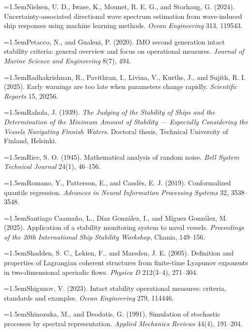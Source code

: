 \documentclass[11pt]{article}
\begin{document}
\hangindent=1.5em\noindent Nielsen, U. D., Iwase, K., Mounet, R. E. G., and Storhaug, G. (2024). Uncertainty-associated directional wave spectrum estimation from wave-induced ship responses using machine learning methods. \emph{Ocean Engineering} 313, 119543.\par
\hangindent=1.5em\noindent Petacco, N., and Gualeni, P. (2020). IMO second generation intact stability criteria: general overview and focus on operational measures. \emph{Journal of Marine Science and Engineering} 8(7), 494.\par
\hangindent=1.5em\noindent Radhakrishnan, R., Pavithran, I., Livina, V., Kurths, J., and Sujith, R. I. (2025). Early warnings are too late when parameters change rapidly. \emph{Scientific Reports} 15, 20256.\par
\hangindent=1.5em\noindent Rahola, J. (1939). \emph{The Judging of the Stability of Ships and the Determination of the Minimum Amount of Stability --- Especially Considering the Vessels Navigating Finnish Waters}. Doctoral thesis, Technical University of Finland, Helsinki.\par
\hangindent=1.5em\noindent Rice, S. O. (1945). Mathematical analysis of random noise. \emph{Bell System Technical Journal} 24(1), 46--156.\par
\hangindent=1.5em\noindent Romano, Y., Patterson, E., and Cand\`es, E. J. (2019). Conformalized quantile regression. \emph{Advances in Neural Information Processing Systems} 32, 3538--3548.\par
\hangindent=1.5em\noindent Santiago Caama\~no, L., D\'iaz Gonz\'alez, I., and M\'iguez Gonz\'alez, M. (2025). Application of a stability monitoring system to naval vessels. \emph{Proceedings of the 20th International Ship Stability Workshop}, Chania, 149--156.\par
\hangindent=1.5em\noindent Shadden, S. C., Lekien, F., and Marsden, J. E. (2005). Definition and properties of Lagrangian coherent structures from finite-time Lyapunov exponents in two-dimensional aperiodic flows. \emph{Physica D} 212(3--4), 271--304.\par
\hangindent=1.5em\noindent Shigunov, V. (2023). Intact stability operational measures: criteria, standards and examples. \emph{Ocean Engineering} 279, 114446.\par
\hangindent=1.5em\noindent Shinozuka, M., and Deodatis, G. (1991). Simulation of stochastic processes by spectral representation. \emph{Applied Mechanics Reviews} 44(4), 191--204.\par
\end{document}
